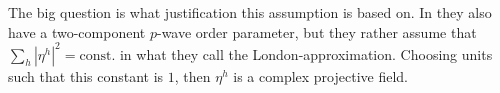 The big question is what justification this assumption is based on. In \cite{shimizu12} they also have a two-component $p$-wave order parameter, but they rather assume that
$\sum_h|\eta^h|^2 = \text{const.}$ in what they call the London-approximation. Choosing units such that this constant is $1$, then $\eta^h$ is a complex projective field.
